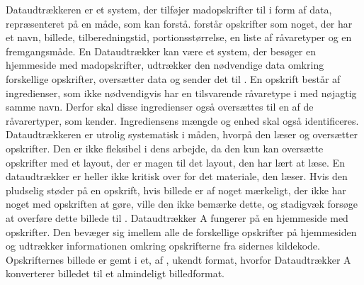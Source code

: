 {Dataudtrækkeren er et system, der tilføjer madopskrifter til \Foodl{} i form af data, repræsenteret på en måde, som \Foodl{} kan forstå. \Foodl{} forstår opskrifter som noget, der har et navn, billede, tilberedningstid, portionsstørrelse, en liste af råvaretyper og en fremgangsmåde. En Dataudtrækker kan \fx være et system, der besøger en hjemmeside med madopskrifter, udtrækker den nødvendige data omkring forskellige opskrifter, oversætter data og sender det til \Foodl{}. En opskrift består af ingredienser, som ikke nødvendigvis har en tilsvarende råvaretype i \Foodl{} med nøjagtig samme navn. Derfor skal disse ingredienser også oversættes til en af de råvarertyper, som \Foodl{} kender. Ingrediensens mængde og enhed skal også identificeres.}
{Dataudtrækkeren er utrolig systematisk i måden, hvorpå den læser og oversætter opskrifter. Den er ikke fleksibel i dens arbejde, da den kun kan oversætte opskrifter med et layout, der er magen til det layout, den har lært at læse. En dataudtrækker er heller ikke kritisk over for det materiale, den læser. Hvis den pludselig støder på en opskrift, hvis billede er af noget mærkeligt, der ikke har noget med opskriften at gøre, ville den ikke bemærke dette, og stadigvæk forsøge at overføre dette billede til \Foodl{}.}
{Dataudtrækker A fungerer på en hjemmeside med opskrifter. Den bevæger sig imellem alle de forskellige opskrifter på hjemmesiden og udtrækker informationen omkring opskrifterne fra sidernes kildekode. Opskrifternes billede er gemt i et, af \Foodl, ukendt format, hvorfor Dataudtrækker A konverterer billedet til et almindeligt billedformat.}